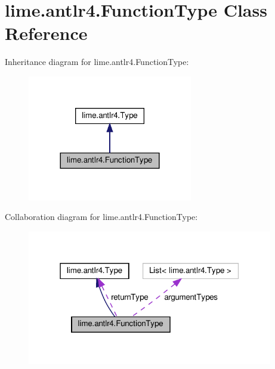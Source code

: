 \hypertarget{classlime_1_1antlr4_1_1FunctionType}{}\section{lime.\+antlr4.\+Function\+Type Class Reference}
\label{classlime_1_1antlr4_1_1FunctionType}


Inheritance diagram for lime.\+antlr4.\+Function\+Type\+:
\nopagebreak
\begin{figure}[H]
\begin{center}
\leavevmode
\includegraphics[width=204pt]{classlime_1_1antlr4_1_1FunctionType__inherit__graph}
\end{center}
\end{figure}


Collaboration diagram for lime.\+antlr4.\+Function\+Type\+:
\nopagebreak
\begin{figure}[H]
\begin{center}
\leavevmode
\includegraphics[width=304pt]{classlime_1_1antlr4_1_1FunctionType__coll__graph}
\end{center}
\end{figure}
